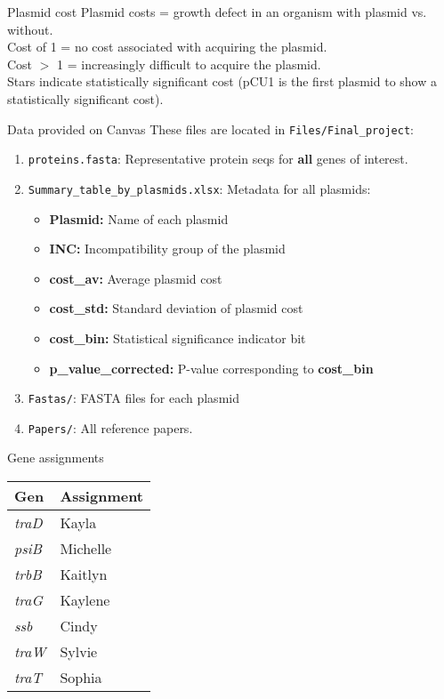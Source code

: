 \documentclass{beamer}
\renewcommand{\c}[1]{\begin{center}#1\end{center}}
\newcommand{\gr}[2][.95]{\c{\texttt{[image: \#2]}}}
\begin{document}
\begin{frame}{Plasmid cost}
    \footnotesize
    \fbox{\gr{final_assignment_figs/final_assignment_fig1.png}}
    Plasmid costs = growth defect in an organism with plasmid vs. without.\\
    Cost of 1 = no cost associated with acquiring the plasmid.\\
    Cost $>$ 1 = increasingly difficult to acquire the plasmid.\\
    Stars indicate statistically significant cost (pCU1 is the first plasmid to show a statistically significant cost).
\end{frame}

\begin{frame}{Data provided on Canvas}
These files are located in \texttt{Files/Final\_project}:
\begin{enumerate}
    \item \texttt{proteins.fasta}: Representative protein seqs for \textbf{all} genes of interest.
    \item \texttt{Summary\_table\_by\_plasmids.xlsx}: Metadata for all plasmids:
    \begin{itemize}
        \item \textbf{Plasmid:} Name of each plasmid
        \item \textbf{INC:} Incompatibility group of the plasmid
        \item \textbf{cost\_av:} Average plasmid cost
        \item \textbf{cost\_std:} Standard deviation of plasmid cost
        \item \textbf{cost\_bin:} Statistical significance indicator bit
        \item \textbf{p\_value\_corrected:} P-value corresponding to \textbf{cost\_bin}
    \end{itemize}
    \item \texttt{Fastas/}: FASTA files for each plasmid
    \item \texttt{Papers/}: All reference papers.
\end{enumerate}
\end{frame}

\begin{frame}{Gene assignments}
    \begin{table}[h!]
        \centering
        \begin{tabular}{l|l}
            \textbf{Gen} &	\textbf{Assignment}\\
            \hline
            \textit{traD}	& Kayla\\
            \textit{psiB}	& Michelle\\
            \textit{trbB}	& Kaitlyn\\
            \textit{traG}	& Kaylene\\
            \textit{ssb}	& Cindy\\
            \textit{traW}	& Sylvie\\
            \textit{traT}	& Sophia\\
        \end{tabular}
        \label{tab:assignments}
    \end{table}
\end{frame}
\end{document}

